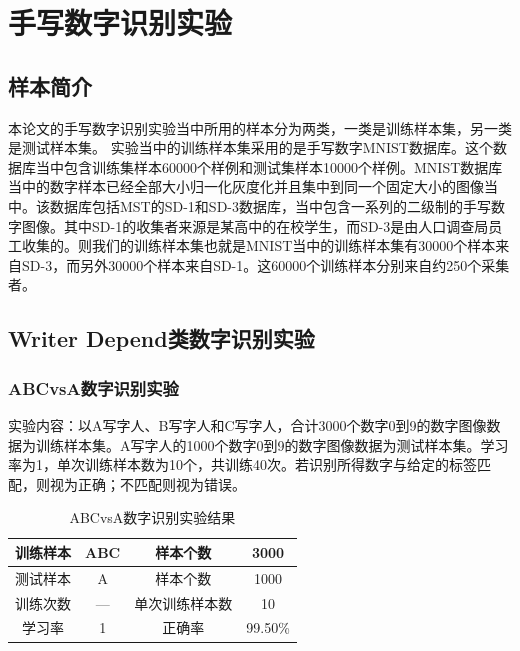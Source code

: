\section{手写数字识别实验}
\subsection{样本简介}

本论文的手写数字识别实验当中所用的样本分为两类，一类是训练样本集，另一类是测试样本集。
实验当中的训练样本集采用的是手写数字MNIST数据库。这个数据库当中包含训练集样本60000个样例和测试集样本10000个样例。MNIST数据库当中的数字样本已经全部大小归一化灰度化并且集中到同一个固定大小的图像当中。该数据库包括MST的SD-1和SD-3数据库，当中包含一系列的二级制的手写数字图像。其中SD-1的收集者来源是某高中的在校学生，而SD-3是由人口调查局员工收集的。则我们的训练样本集也就是MNIST当中的训练样本集有30000个样本来自SD-3，而另外30000个样本来自SD-1。这60000个训练样本分别来自约250个采集者。
\subsection{Writer Depend类数字识别实验}
\subsubsection{ABCvsA数字识别实验}
实验内容：以A写字人、B写字人和C写字人，合计3000个数字0到9的数字图像数据为训练样本集。A写字人的1000个数字0到9的数字图像数据为测试样本集。学习率为1，单次训练样本数为10个，共训练40次。若识别所得数字与给定的标签匹配，则视为正确；不匹配则视为错误。
\begin{table}[htbp]
    \centering
    \caption{ABCvsA数字识别实验结果}
    \label{tab:1}
    \begin{tabular}{@{}cccc@{}}
        \toprule
        训练样本 & ABC & 样本个数    & 3000    \\ \midrule
        测试样本 & A   & 样本个数    & 1000    \\
        训练次数 & —   & 单次训练样本数 & 10      \\
        学习率  & 1   & 正确率     & 99.50\% \\ \bottomrule
    \end{tabular}
\end{table}

